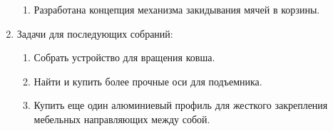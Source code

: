 \begin{enumerate}
\begin{enumerate}
      \item  Разработана концепция механизма закидывания мячей в корзины.\newline
    \end{enumerate}
    
	\item Задачи для последующих собраний:\newline
	\begin{enumerate}
	  \item Собрать устройство для вращения ковша.\newline
	  
	  \item Найти и купить более прочные оси для подъемника.\newline
	  
	  \item Купить еще один алюминиевый профиль для жесткого закрепления мебельных направляющих между собой.\newline

    \end{enumerate}     
\end{enumerate}

\fillpage
